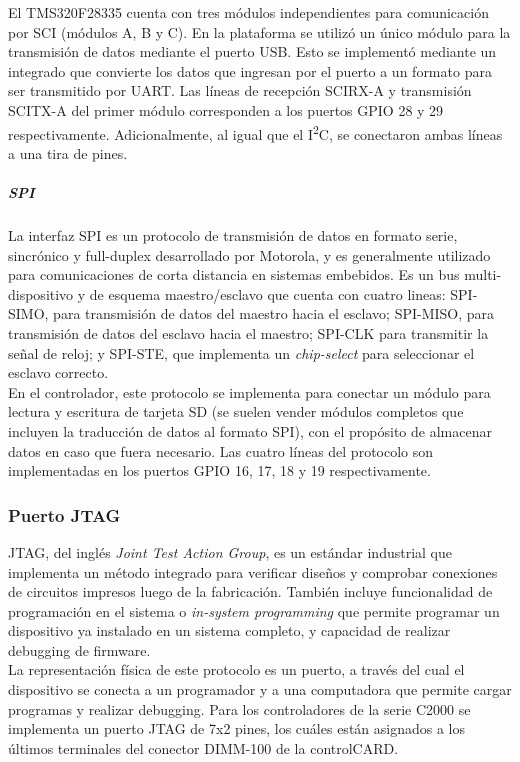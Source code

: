 El TMS320F28335 cuenta con tres módulos independientes para comunicación por SCI (módulos A, B y C). En la plataforma se utilizó un único módulo para la transmisión de datos mediante el puerto USB. Esto se implementó mediante un integrado que convierte los datos que ingresan por el puerto a un formato para ser transmitido por UART. Las líneas de recepción SCIRX-A y transmisión SCITX-A del primer módulo corresponden a los puertos GPIO 28 y 29 respectivamente. Adicionalmente, al igual que el I\textsuperscript{2}C, se conectaron ambas líneas a una tira de pines.\\

\subparagraph{SPI}

La interfaz SPI es un protocolo de transmisión de datos en formato serie, sincrónico y full-duplex desarrollado por Motorola, y es generalmente utilizado para comunicaciones de corta distancia en sistemas embebidos. Es un bus multi-dispositivo y de esquema maestro/esclavo que cuenta con cuatro lineas: SPI-SIMO, para transmisión de datos del maestro hacia el esclavo; SPI-MISO, para transmisión de datos del esclavo hacia el maestro; SPI-CLK para transmitir la señal de reloj; y SPI-STE, que implementa un \textit{chip-select} para seleccionar el esclavo correcto.\\

En el controlador, este protocolo se implementa para conectar un módulo para lectura y escritura de tarjeta SD (se suelen vender módulos completos que incluyen la traducción de datos al formato SPI), con el propósito de almacenar datos en caso que fuera necesario. Las cuatro líneas del protocolo son implementadas en los puertos GPIO 16, 17, 18 y 19 respectivamente.\\

\subsubsection{Puerto JTAG}

JTAG, del inglés \textit{Joint Test Action Group}, es un estándar industrial que implementa un método integrado para verificar diseños y comprobar conexiones de circuitos impresos luego de la fabricación. También incluye funcionalidad de programación en el sistema o \textit{in-system programming} que permite programar un dispositivo ya instalado en un sistema completo, y capacidad de realizar debugging de firmware.\\

La representación física de este protocolo es un puerto, a través del cual el dispositivo se conecta a un programador y a una computadora que permite cargar programas y realizar debugging. Para los controladores de la serie C2000 se implementa un puerto JTAG de 7x2 pines, los cuáles están asignados a los últimos terminales del conector DIMM-100 de la controlCARD.\\

